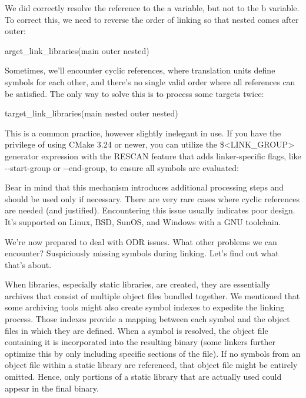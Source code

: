 We did correctly resolve the reference to the a variable, but not to the b variable. To correct this, we need to reverse the order of linking so that nested comes after outer:

\begin{cmake}
arget_link_libraries(main outer nested)
\end{cmake}

Sometimes, we’ll encounter cyclic references, where translation units define symbols for each other, and there’s no single valid order where all references can be satisfied. The only way to solve this is to process some targets twice:

\begin{cmake}
target_link_libraries(main nested outer nested)
\end{cmake}

This is a common practice, however slightly inelegant in use. If you have the privilege of using CMake 3.24 or newer, you can utilize the \$<LINK\_GROUP> generator expression with the RESCAN feature that adds linker-specific flags, like -{}-start-group or -{}-end-group, to ensure all symbols are evaluated:


Bear in mind that this mechanism introduces additional processing steps and should be used only if necessary. There are very rare cases where cyclic references are needed (and justified). Encountering this issue usually indicates poor design. It’s supported on Linux, BSD, SunOS, and Windows with a GNU toolchain.

We’re now prepared to deal with ODR issues. What other problems we can encounter? Suspiciously missing symbols during linking. Let’s find out what that’s about.


When libraries, especially static libraries, are created, they are essentially archives that consist of multiple object files bundled together. We mentioned that some archiving tools might also create symbol indexes to expedite the linking process. Those indexes provide a mapping between each symbol and the object files in which they are defined. When a symbol is resolved, the object file containing it is incorporated into the resulting binary (some linkers further optimize this by only including specific sections of the file). If no symbols from an object file within a static library are referenced, that object file might be entirely omitted. Hence, only portions of a static library that are actually used could appear in the final binary.

